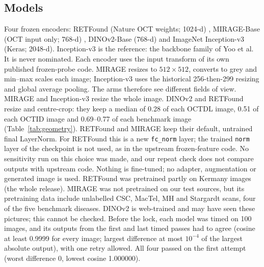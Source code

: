 \documentclass[conference]{IEEEtran}
\begin{document}
\subsection{Models}
\label{sec:models}
Four frozen encoders: RETFound (Nature OCT weights; 1024-d) \cite{RETFound2023}, MIRAGE-Base (OCT input only; 768-d) \cite{MIRAGE2025}, DINOv2-Base (768-d) \cite{DINOv2} and ImageNet Inception-v3 (Keras; 2048-d). Inception-v3 is the reference: the backbone family of Yoo et al. It is never nominated.
Each encoder uses the input transform of its own published frozen-probe code. MIRAGE resizes to $512\times512$, converts to grey and min--max scales each image; Inception-v3 uses the historical 256-then-299 resizing and global average pooling. The arms therefore see different fields of view. MIRAGE and Inception-v3 resize the whole image. DINOv2 and RETFound resize and centre-crop: they keep a median of 0.28 of each OCTDL image, 0.51 of each OCTID image and 0.69--0.77 of each benchmark image (Table~\ref{tab:geometry}).
RETFound and MIRAGE keep their default, untrained final LayerNorm. For RETFound this is a new \texttt{fc\_norm} layer; the trained \texttt{norm} layer of the checkpoint is not used, as in the upstream frozen-feature code. No sensitivity run on this choice was made, and our repeat check does not compare outputs with upstream code.
Nothing is fine-tuned; no adapter, augmentation or generated image is used. RETFound was pretrained partly on Kermany images (the whole release). MIRAGE was not pretrained on our test sources, but its pretraining data include unlabelled CSC, MacTel, MH and Stargardt scans, four of the five benchmark diseases. DINOv2 is web-trained and may have seen these pictures; this cannot be checked.
Before the lock, each model was timed on 100 images, and its outputs from the first and last timed passes had to agree (cosine at least 0.9999 for every image; largest difference at most $10^{-4}$ of the largest absolute output), with one retry allowed. All four passed on the first attempt (worst difference 0, lowest cosine 1.000000).
\end{document}
